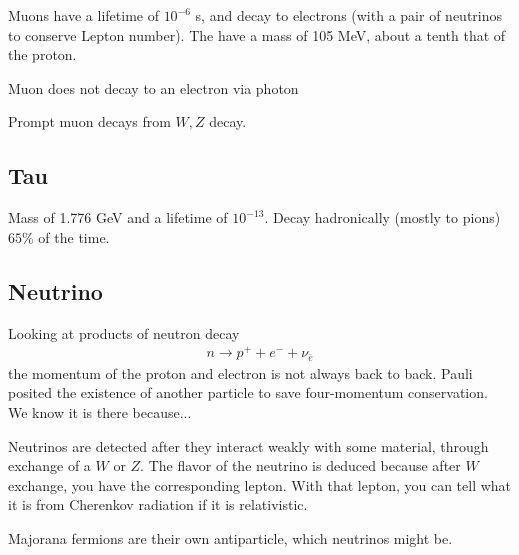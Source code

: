 Muons have a lifetime of $10^{-6}$ s, and decay to electrons (with a pair of neutrinos to conserve Lepton number). The have a mass of 105 MeV, about a tenth that of the proton.

Muon does not decay to an electron via photon

Prompt muon decays from $W,Z$ decay.

\subsection{Tau}
Mass of 1.776 GeV and a lifetime of $10^{-13}$. Decay hadronically (mostly to pions) $65\%$ of the time.

\subsection{Neutrino}\label{neutrino}
Looking at products of neutron decay 
\begin{align}
n\rightarrow p^+ + e^-+ \nu_{\bar{e}}
\end{align}
the momentum of the proton and electron is not always back to back. Pauli posited the existence of another particle to save four-momentum conservation. We know it is there because...

Neutrinos are detected after they interact weakly with some material, through exchange of a $W$ or $Z$. The flavor of the neutrino is deduced because after $W$ exchange, you have the corresponding lepton. With that lepton, you can tell what it is from Cherenkov radiation if it is relativistic.

Majorana fermions are their own antiparticle, which neutrinos might be.


